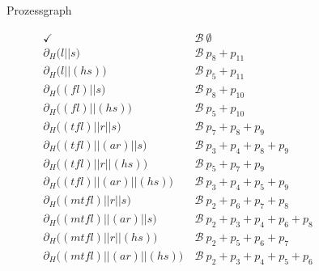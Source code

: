 \documentclass[a4paper]{scrartcl}
\begin{document}
\begin{enumerate}
\begin{sidewaysfigure}[h]
{
            }
            \caption{Prozessgraph}
            \label{fig:13-3-process}
        \end{sidewaysfigure}

         \begin{equation}
            \begin{split}
                \checkmark \ &\mathcal{B}\  \emptyset \\
                \partial_H \Big( l || s \Big) \ &\mathcal{B}\  p_8 + p_{11} \\
                \partial_H \Big( l || (hs) \Big) \ &\mathcal{B}\  p_5 + p_{11} \\
                \partial_H \Big( (fl) || s \Big) \ &\mathcal{B}\  p_8 + p_{10} \\
                \partial_H \Big( (fl) || (hs) \Big) \ &\mathcal{B}\  p_5 + p_{10} \\
                \partial_H \Big( (tfl) || r || s \Big) \ &\mathcal{B}\  p_7 + p_8 + p_9 \\
                \partial_H \Big( (tfl) || (ar) || s \Big) \ &\mathcal{B}\  p_3 + p_4 + p_8 + p_9 \\
                \partial_H \Big( (tfl) || r || (hs) \Big) \ &\mathcal{B}\  p_5 + p_7 + p_9 \\
                \partial_H \Big( (tfl) || (ar) || (hs) \Big) \ &\mathcal{B}\  p_3 + p_4 + p_5 + p_9 \\
                \partial_H \Big( (mtfl) || r || s \Big) \ &\mathcal{B}\  p_2 + p_6 + p_7 + p_8 \\
                \partial_H \Big( (mtfl) || (ar) || s \Big) \ &\mathcal{B}\  p_2 + p_3 + p_4 + p_6 + p_8 \\
                \partial_H \Big( (mtfl) || r || (hs) \Big) \ &\mathcal{B}\  p_2 + p_5 + p_6 + p_7 \\
                \partial_H \Big( (mtfl) || (ar) || (hs) \Big) \ &\mathcal{B}\  p_2 + p_3 + p_4 + p_5 + p_6 \\

\end{split}
\end{equation}
\end{enumerate}
\end{document}

